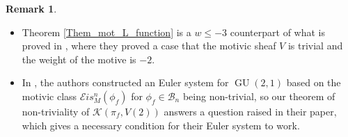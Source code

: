 \documentclass[11pt, a4paper]{amsart}
\theoremstyle{plain}
\theoremstyle{definition}
\newtheorem{remark}[theorem]{Remark}
\numberwithin{equation}{section}
\DeclareMathOperator{\GU}{GU}
\begin{document}
\begin{remark} 
    \begin{itemize}
        \item Theorem \ref{Them_mot_L_function} is a $w \le -3$ counterpart of what is proved in \cite[Theorem 8.18]{PS18}, where they proved a case that the motivic sheaf $V$ is trivial and the weight of the motive is $-2$. 
        \item In \cite{LSZ22}, the authors constructed an Euler system for $\GU(2,1)$ based on the motivic class $\mathcal{E}is_{M}^n(\phi_f)$ for $\phi_f \in \mathcal{B}_{n}$ being non-trivial, so our theorem of non-triviality of $\mathcal{K}(\pi_f, V(2))$ answers a question raised in their paper, which gives a necessary condition for their Euler system to work. 
    \end{itemize}
\end{remark}






\bigskip



\end{document}
